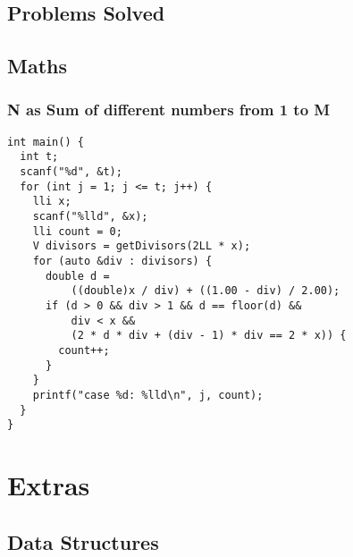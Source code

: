 \documentclass[twoside]{article}
\begin{document}
\begin{multicols*}{2}
\sectionfont{\bfseries\sffamily\centering\Huge}
\vspace{1em}
\section*{Problems Solved}
\vspace{3em}
\subsectionfont{\bfseries\sffamily\centering\LARGE}
\vspace{0em}
\subsection*{Maths}
\vspace{2em}
\subsubsectionfont{\large\bfseries\sffamily\underline}
\subsubsection*{N as Sum of different numbers from 1 to M}
\begin{verbatim}
int main() {
  int t;
  scanf("%d", &t);
  for (int j = 1; j <= t; j++) {
    lli x;
    scanf("%lld", &x);
    lli count = 0;
    V divisors = getDivisors(2LL * x);
    for (auto &div : divisors) {
      double d =
          ((double)x / div) + ((1.00 - div) / 2.00);
      if (d > 0 && div > 1 && d == floor(d) &&
          div < x &&
          (2 * d * div + (div - 1) * div == 2 * x)) {
        count++;
      }
    }
    printf("case %d: %lld\n", j, count);
  }
}
\end{verbatim}

\end{multicols*}
\sectionfont{\bfseries\sffamily\centering\Huge}
\vspace{1em}
\section*{Extras}
\vspace{3em}
\subsectionfont{\bfseries\sffamily\centering\LARGE}
\vspace{0em}
\subsection*{Data Structures}
\vspace{2em}
\subsubsectionfont{\bfseries\sffamily\centering\Large}
\vspace{0em}
\end{document}
